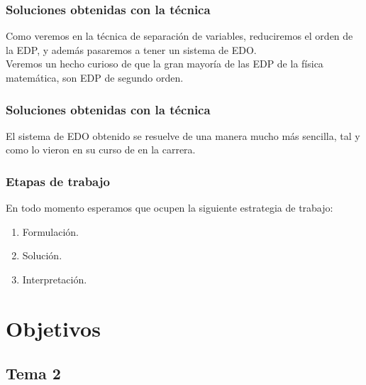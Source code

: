 \documentclass[12pt]{beamer}
\begin{document}
\begin{frame}
\frametitle{Soluciones obtenidas con la técnica}
Como veremos en la técnica de separación de variables, reduciremos el orden de la EDP, y además pasaremos a tener un sistema de EDO.
\\
\bigskip
Veremos un hecho curioso de que la gran mayoría de las EDP de la física matemática, son EDP de segundo orden.
\end{frame}
\begin{frame}
\frametitle{Soluciones obtenidas con la técnica}
El sistema de EDO obtenido se resuelve de una manera mucho más sencilla, tal y como lo vieron en su curso de  en la carrera.
\end{frame}
\begin{frame}
\frametitle{Etapas de trabajo}
En todo momento esperamos que ocupen la siguiente estrategia de trabajo:
\begin{enumerate}[<+->]
\item Formulación.
\item Solución.
\item Interpretación.
\end{enumerate}
\end{frame}

\section{Objetivos}
\subsection{Tema 2}
\end{document}
